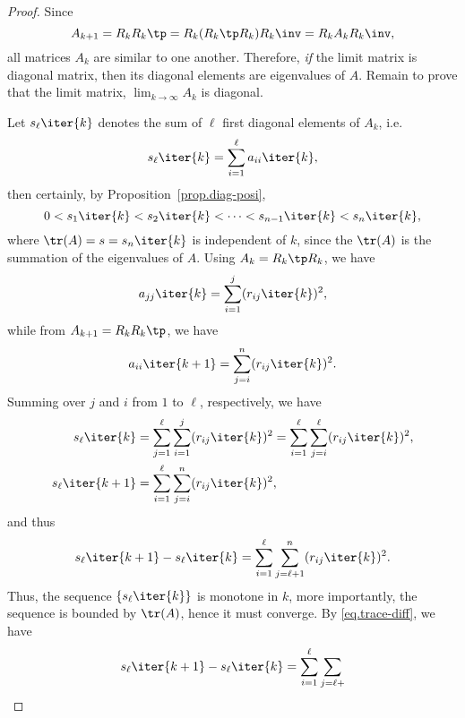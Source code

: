\begin{proof}
Since
\begin{equation}\notag
  A_{k+1} = R_{k}R_{k}\tp = R_{k}(R_{k}\tp R_{k})R_{k}\inv = R_{k}A_{k}R_{k}\inv,
\end{equation}
all matrices $A_{k}$ are similar to one another. Therefore, \emph{if} the
limit matrix is diagonal matrix, then its diagonal elements are eigenvalues
of $A$. Remain to prove that the limit matrix, $\lim_{k\to\infty}A_{k}$ is
diagonal.

Let $s_{\ell}\iter{k}$ denotes the sum of $\ell$ first diagonal elements of
$A_{k}$, i.e.
\begin{equation}\notag
  s_{\ell}\iter{k} = \sum_{i=1}^{\ell}a_{ii}\iter{k},
\end{equation}
then certainly, by Proposition~\ref{prop.diag-posi},
\begin{equation}\notag
  0 < s_{1}\iter{k} < s_{2}\iter{k} < \cdots < s_{n-1}\iter{k} <s_{n}\iter{k},
\end{equation}
where $\tr(A) = s = s_{n}\iter{k}$ is independent of $k$, since the
$\tr(A)$ is the summation of the eigenvalues of $A$. Using
$A_{k} = R_{k}\tp R_{k}$, we have
\begin{equation}\notag
  a_{jj}\iter{k} = \sum_{i=1}^{j}(r_{ij}\iter{k})^{2},
\end{equation}
while from $A_{k+1} = R_{k}R_{k}\tp$, we have
\begin{equation}\notag
  a_{ii}\iter{k+1} = \sum_{j=i}^{n}(r_{ij}\iter{k})^{2}.
\end{equation}
Summing over $j$ and $i$ from $1$ to $\ell$, respectively, we have
\begin{align*}
  s_{\ell}\iter{k} &= \sum_{j=1}^{\ell}\sum_{i=1}^{j}(r_{ij}\iter{k})^{2} =
                     \sum_{i=1}^{\ell}\sum_{j=i}^{\ell}(r_{ij}\iter{k})^{2},\\
  s_{\ell}\iter{k+1} &= \sum_{i=1}^{\ell}\sum_{j=i}^{n}(r_{ij}\iter{k})^{2},
\end{align*}
and thus
\begin{equation}\label{eq.trace-diff}
  s_{\ell}\iter{k+1} - s_{\ell}\iter{k} = \sum_{i=1}^{\ell} \sum_{j=\ell +
  1}^{n} (r_{ij}\iter{k})^{2}.
\end{equation}
Thus, the sequence $\{s_{\ell}\iter{k}\}$ is monotone in $k$, more
importantly, the sequence is bounded by $\tr(A)$, hence it must converge.
By \eqref{eq.trace-diff}, we have
\begin{equation}\notag
  s_{\ell}\iter{k+1} - s_{\ell}\iter{k} = \sum_{i=1}^{\ell} \sum_{j=\ell +
}
\end{equation}
\end{proof}
